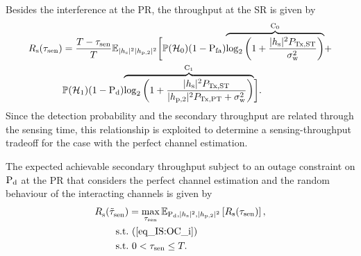 Besides the interference at the PR, the throughput at the SR is given by %
\begin{align}
R_{\text{s}}(\tau_{\text{sen}}) &= \frac{T - \tau_{\text{sen}}}{T} \mathbb{E}_{|h_{\text{s}}|^2 |h_{\text{p,2}}|^2} \bigg[ \mathbb P(\mathcal{H}_0) (1 - \text{P}_{\text{fa}}) \smash[b]{\overbrace{\log_2 \bigg( 1 + \frac{|h_{\text{s}}|^2 P_{\text{Tx,ST}}}{\sigma^2_{\text{w}}} \bigg)}^{\text{C}_{\text{0}}}} + \nonumber \\ & \mathbb P(\mathcal{H}_1) (1 - \text{P}_{\text{d}}) \smash[b]{\overbrace{\log_2 \bigg( 1 + \frac{|h_{\text{s}}|^2 P_{\text{Tx,ST}}}{|h_{\text{p,2}}|^2 P_{\text{Tx,PT}} + \sigma^2_{\text{w}}} \bigg)}^{\text{C}_{\text{1}}}} \bigg]. \label{eq_IS:thr_i} 
\end{align}
Since the detection probability and the secondary throughput are related through the sensing time, this relationship is exploited to determine a sensing-throughput tradeoff for the case with the perfect channel estimation.
\begin{theorem} \label{th_IS:th3}
\normalfont
The expected achievable secondary throughput subject to an outage constraint on $\text{P}_{\text{d}}$ at the PR that considers the perfect channel estimation and the random behaviour of the interacting channels is given by
\begin{align}
{R}_{\text{s}}^{\text{}}(\tilde{\tau}_{\text{sen}}^{\text{}}) &= \operatorname*{max}_{\tau_{\text{sen}}} {\mathbb E}_{\text{P}_{\text{d}}, |h_{\text{s}}|^2, |h_{\text{p,2}}|^2}\left[ R_{\text{s}}(\tau_{\text{sen}}) \right], \label{eq_IS:STT_i} \\
\text{s.t.} & \text{ }  (\ref{eq_IS:OC_i}) \nonumber \\ 
\text{s.t.} & \text{ }  0 < \tau_{\text{sen}} \le T. \nonumber
\end{align}
\end{theorem}
